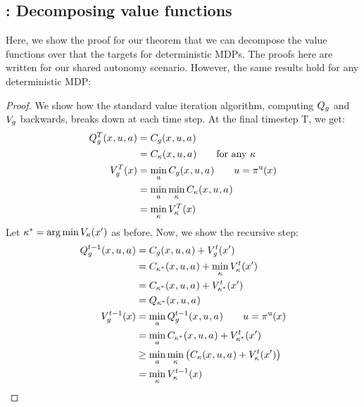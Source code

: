 \begin{appendices}
\subsection{: Decomposing value functions}
Here, we show the proof for our theorem that we can decompose the value functions over that the targets for deterministic MDPs. The proofs here are written for our shared autonomy scenario. However, the same results hold for any deterministic MDP:
\valfundecompose*
\begin{proof}
We show how the standard value iteration algorithm, computing $Q_{g}$ and $V_{g}$ backwards, breaks down at each time step. At the final timestep T, we get:
\begin{align*}
  Q_{g}^{T}(x_{ }, u_{ }, a_{ }) &= C_g(x_{ }, u_{ }, a_{ })\\
  &= C_{\kappa}(x_{ }, u_{ }, a_{ }) \qquad \text{for any $\kappa$}\\
  V_{g}^{T}(x) &= \min_{a} C_g(x_{ }, u_{ }, a_{ }) \qquad u = \pi^{\text{u}}(x)\\
  &= \min_{a} \min_\kappa C_{\kappa}(x_{ }, u_{ }, a_{ }) \\
  &= \min_\kappa V_{\kappa}^{T}(x)
\end{align*}
Let $\kappa^* = \operatorname*{arg\,min} V_{\kappa}(x')$ as before. Now, we show the recursive step:
\begin{align*}
  \qgoalt{t-1}(\stateenvactions) &= \costgoal(\stateenvactions) + \vgoalt{t}(\stateenv')\\
  &= \costtargstar(\stateenvactions) + \min_\target \vtargt{t}(\stateenv') \hspace{1.3em}\\%
  &= \costtargstar(\stateenvactions) + \vtargstart{t}(\stateenv')\\%
  &= \qtargstar(\stateenvactions)\\
  \vgoalt{t-1}(\stateenv) &= \min_{\actionrobot} \qgoalt{t-1}(\stateenvactions)  \qquad \actionuser = \policyuser(\stateenv)\\
  &=  \min_{\actionrobot} \costtargstar(\stateenvactions) + \vtargstart{t}(\stateenv')\\%
  & \geq  \min_{\actionrobot} \min_\target \left( \costtarg(\stateenvactions) + \vtargt{t}(\stateenv') \right)\\
  &= \min_\target \vtargt{t-1}(\stateenv)
\end{align*}



\end{proof}
\end{appendices}
